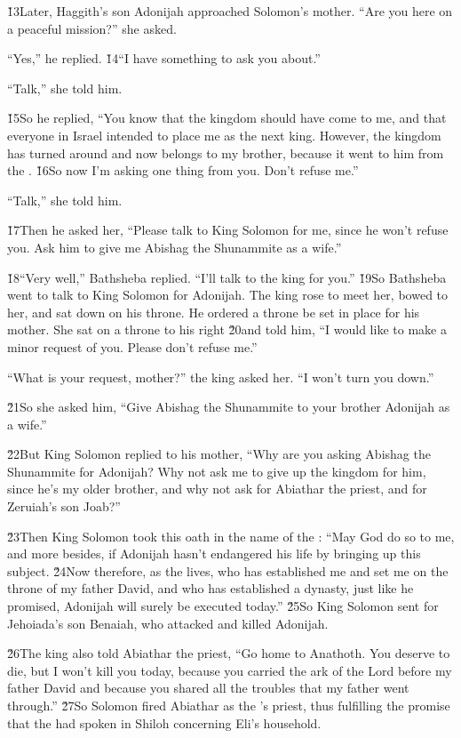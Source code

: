 \v{13}Later, Haggith's son Adonijah approached Solomon's mother. ``Are you here on a peaceful mission?'' she asked.

``Yes,'' he replied. \v{14}``I have something to ask you about.''

``Talk,'' she told him.

\v{15}So he replied, ``You know that the kingdom should have come to me, and that everyone in Israel intended to place me as the next king. However, the kingdom has turned around and now belongs to my brother, because it went to him from the . \v{16}So now I'm asking one thing from you. Don't refuse me.''

``Talk,'' she told him.

\v{17}Then he asked her, ``Please talk to King Solomon for me, since he won't refuse you. Ask him to give me Abishag the Shunammite as a wife.''

\v{18}``Very well,'' Bathsheba replied. ``I'll talk to the king for you.'' \v{19}So Bathsheba went to talk to King Solomon for Adonijah. The king rose to meet her, bowed to her, and sat down on his throne. He ordered a throne be set in place for his mother. She sat on a throne to his right \v{20}and told him, ``I would like to make a minor request of you. Please don't refuse me.''

``What is your request, mother?'' the king asked her. ``I won't turn you down.''

\v{21}So she asked him, ``Give Abishag the Shunammite to your brother Adonijah as a wife.''

\v{22}But King Solomon replied to his mother, ``Why are you asking Abishag the Shunammite for Adonijah? Why not ask me to give up the kingdom for him, since he's my older brother, and why not ask for Abiathar the priest, and for Zeruiah's son Joab?''

\v{23}Then King Solomon took this oath in the name of the : ``May God do so to me, and more besides, if Adonijah hasn't endangered his life by bringing up this subject. \v{24}Now therefore, as the  lives, who has established me and set me on the throne of my father David, and who has established a dynasty, just like he promised, Adonijah will surely be executed today.'' \v{25}So King Solomon sent for Jehoiada's son Benaiah, who attacked and killed Adonijah.

\v{26}The king also told Abiathar the priest, ``Go home to Anathoth. You deserve to die, but I won't kill you today, because you carried the ark of the Lord  before my father David and because you shared all the troubles that my father went through.'' \v{27}So Solomon fired Abiathar as the 's priest, thus fulfilling the promise that the  had spoken in Shiloh concerning Eli's household.

